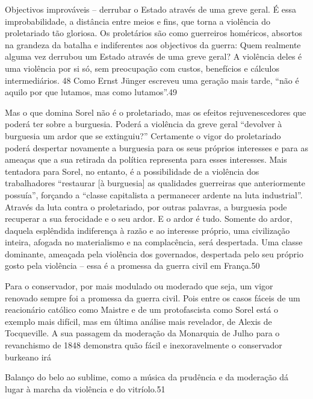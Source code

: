  \par 
Objectivos improváveis ​​– derrubar o Estado através de uma greve geral. É essa improbabilidade, a distância entre meios e fins, que torna a violência do proletariado tão gloriosa. Os proletários são como guerreiros homéricos, absortos na grandeza da batalha e indiferentes aos objectivos da guerra: Quem realmente alguma vez derrubou um Estado através de uma greve geral? A violência deles é uma violência por si só, sem preocupação com custos, benefícios e cálculos intermediários. {\color{blue}48} Como Ernst Jünger escreveu uma geração mais tarde, “não é aquilo por que lutamos, mas como lutamos”.{\color{blue}49}
 \par 
Mas o que domina Sorel não é o proletariado, mas os efeitos rejuvenescedores que poderá ter sobre a burguesia. Poderá a violência da greve geral “devolver à burguesia um ardor que se extinguiu?” Certamente o vigor do proletariado poderá despertar novamente a burguesia para os seus próprios interesses e para as ameaças que a sua retirada da política representa para esses interesses. Mais tentadora para Sorel, no entanto, é a possibilidade de a violência dos trabalhadores “restaurar [à burguesia] as qualidades guerreiras que anteriormente possuía”, forçando a “classe capitalista a permanecer ardente na luta industrial”. Através da luta contra o proletariado, por outras palavras, a burguesia pode recuperar a sua ferocidade e o seu ardor. E o ardor é tudo. Somente do ardor, daquela esplêndida indiferença à razão e ao interesse próprio, uma civilização inteira, afogada no materialismo e na complacência, será despertada. Uma classe dominante, ameaçada pela violência dos governados, despertada pelo seu próprio gosto pela violência – essa é a promessa da guerra civil em França.{\color{blue}50}
 \par 
Para o conservador, por mais modulado ou moderado que seja, um vigor renovado sempre foi a promessa da guerra civil. Pois entre os casos fáceis de um reacionário católico como Maistre e de um protofascista como Sorel está o exemplo mais difícil, mas em última análise mais revelador, de Alexis de Tocqueville. A sua passagem da moderação da Monarquia de Julho para o revanchismo de 1848 demonstra quão fácil e inexoravelmente o conservador burkeano irá
 \par 
Balanço do belo ao sublime, como a música da prudência e da moderação dá lugar à marcha da violência e do vitríolo.{\color{blue}51}
 \par 
